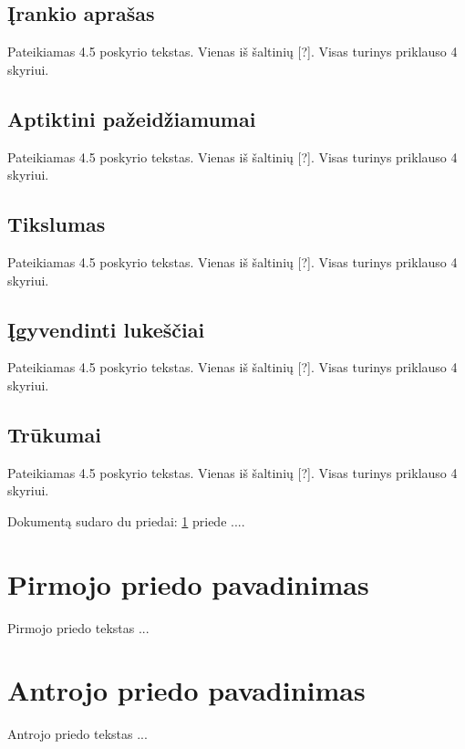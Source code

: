 \documentclass[a4paper,12pt,fleqn]{article}
\begin{document}
\subsection{Įrankio aprašas}
\label{sec:example}

Pateikiamas 4.5 poskyrio tekstas. Vienas iš šaltinių [?]. Visas turinys priklauso 4 skyriui.

\subsection{Aptiktini pažeidžiamumai}
\label{sec:example}

Pateikiamas 4.5 poskyrio tekstas. Vienas iš šaltinių [?]. Visas turinys priklauso 4 skyriui.

\subsection{Tikslumas}
\label{sec:example}

Pateikiamas 4.5 poskyrio tekstas. Vienas iš šaltinių [?]. Visas turinys priklauso 4 skyriui.

\subsection{Įgyvendinti lukeščiai}
\label{sec:example}

Pateikiamas 4.5 poskyrio tekstas. Vienas iš šaltinių [?]. Visas turinys priklauso 4 skyriui.

\subsection{Trūkumai}
\label{sec:example}

Pateikiamas 4.5 poskyrio tekstas. Vienas iš šaltinių [?]. Visas turinys priklauso 4 skyriui.






%



\newpage
\begin{appendices}
Dokumentą sudaro du priedai: \ref{app:a} priede  ....
\newpage
\section{Pirmojo priedo pavadinimas}
\label{app:a}
Pirmojo priedo tekstas ...

\newpage
\section{Antrojo priedo pavadinimas}
Antrojo priedo tekstas ...

\end{appendices}
\end{document}
